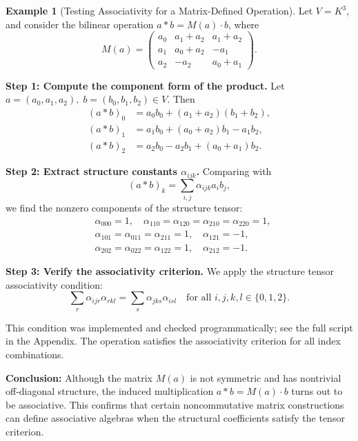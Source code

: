 \documentclass[12pt]{article}
\theoremstyle{definition}
\newtheorem{example}{Example}[section]
\theoremstyle{plain}
\theoremstyle{remark}
\begin{document}
\begin{example}[Testing Associativity for a Matrix-Defined Operation]
Let \( V = K^3 \), and consider the bilinear operation \( a * b = M(a) \cdot b \), where
\[
M(a) =
\begin{pmatrix}
a_0 & a_1 + a_2 & a_1 + a_2 \\
a_1 & a_0 + a_2 & -a_1 \\
a_2 & -a_2 & a_0 + a_1
\end{pmatrix}.
\]

\textbf{Step 1: Compute the component form of the product.}  
Let \( a = (a_0, a_1, a_2),\; b = (b_0, b_1, b_2) \in V \). Then
\begin{align*}
(a * b)_0 &= a_0 b_0 + (a_1 + a_2)(b_1 + b_2), \\
(a * b)_1 &= a_1 b_0 + (a_0 + a_2) b_1 - a_1 b_2, \\
(a * b)_2 &= a_2 b_0 - a_2 b_1 + (a_0 + a_1) b_2.
\end{align*}

\textbf{Step 2: Extract structure constants \( \alpha_{ijk} \).}  
Comparing with
\[
(a * b)_k = \sum_{i,j} \alpha_{ijk} a_i b_j,
\]
we find the nonzero components of the structure tensor:
\begin{align*}
&\alpha_{000} = 1,\quad
\alpha_{110} = \alpha_{120} = \alpha_{210} = \alpha_{220} = 1,\\
&\alpha_{101} = \alpha_{011} = \alpha_{211} = 1,\quad
\alpha_{121} = -1,\\
&\alpha_{202} = \alpha_{022} = \alpha_{122} = 1,\quad
\alpha_{212} = -1.
\end{align*}

\textbf{Step 3: Verify the associativity criterion.}  
We apply the structure tensor associativity condition:
\[
\sum_r \alpha_{ijr} \alpha_{rkl} = \sum_s \alpha_{jks} \alpha_{isl}
\quad \text{for all } i,j,k,l \in \{0,1,2\}.
\]

This condition was implemented and checked programmatically; see the full script in the Appendix. The operation satisfies the associativity criterion for all index combinations.

\textbf{Conclusion:}  
Although the matrix \( M(a) \) is not symmetric and has nontrivial off-diagonal structure, the induced multiplication \( a * b = M(a) \cdot b \) turns out to be associative. This confirms that certain noncommutative matrix constructions can define associative algebras when the structural coefficients satisfy the tensor criterion.

\end{example}
\end{document}
